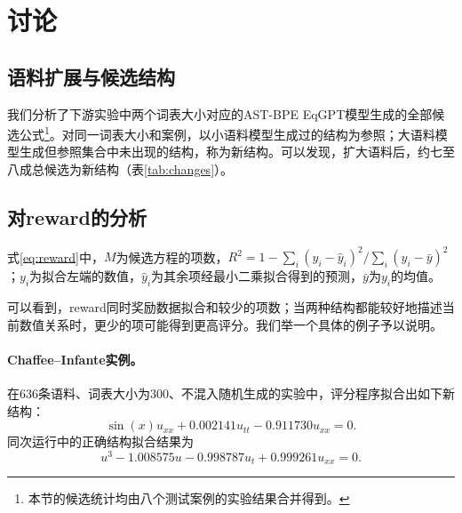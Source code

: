 \documentclass[UTF8,fontset=mac,11pt,letterpaper]{ctexart}
\begin{document}
\begin{table}[H]
\caption[八案例发现结果]{八案例发现结果\protect\footnotemark。表中逐一列出八个案例的结果；每格前一项为Top1是否正确，后一项为Top10是否包含正确结构。表示成功，表示未成功。CD为对流--扩散，KG为Klein--Gordon，E6为Eq.\ 6.2.12，PD为PDE-divide，CI为Chaffee--Infante。总计列为两类成功案例数，组内最高值加粗。}\label{tab:main}
\centering\fontsize{8.5}{10}\selectfont\setlength{\tabcolsep}{2pt}
\end{table}




\begingroup
\setlength{\intextsep}{2pt}
\setlength{\textfloatsep}{5pt}
\setlength{\floatsep}{4pt}
\setlength{\abovedisplayskip}{5pt}
\setlength{\belowdisplayskip}{5pt}
\setlength{\abovedisplayshortskip}{3pt}
\setlength{\belowdisplayshortskip}{3pt}
\section{讨论}
\subsection{语料扩展与候选结构}
我们分析了下游实验中两个词表大小对应的AST-BPE EqGPT模型生成的全部候选公式\footnote{本节的候选统计均由八个测试案例的实验结果合并得到。}。对同一词表大小和案例，以小语料模型生成过的结构为参照；大语料模型生成但参照集合中未出现的结构，称为新结构。可以发现，扩大语料后，约七至八成总候选为新结构（表\ref{tab:changes}）。
\begin{table}[H]
\caption{大语料模型生成的新结构。}\label{tab:changes}
\centering\small
\end{table}

\subsection{对reward的分析}
式\eqref{eq:reward}中，$M$为候选方程的项数，$R^2=1-\sum_i(y_i-\hat y_i)^2/\sum_i(y_i-\bar y)^2$；$y_i$为拟合左端的数值，$\hat y_i$为其余项经最小二乘拟合得到的预测，$\bar y$为$y_i$的均值。

可以看到，reward同时奖励数据拟合和较少的项数；当两种结构都能较好地描述当前数值关系时，更少的项可能得到更高评分。我们举一个具体的例子予以说明。

\paragraph{Chaffee--Infante实例。}
在636条语料、词表大小为300、不混入随机生成的实验中，评分程序拟合出如下新结构：
\begin{equation}\label{eq:wrong}
 \sin(x)u_{xx}+0.002141u_{tt}-0.911730u_{xx}=0.
\end{equation}
同次运行中的正确结构拟合结果为
\begin{equation}\label{eq:correct}
 u^3-1.008575u-0.998787u_t+0.999261u_{xx}=0.
\end{equation}
\end{document}
